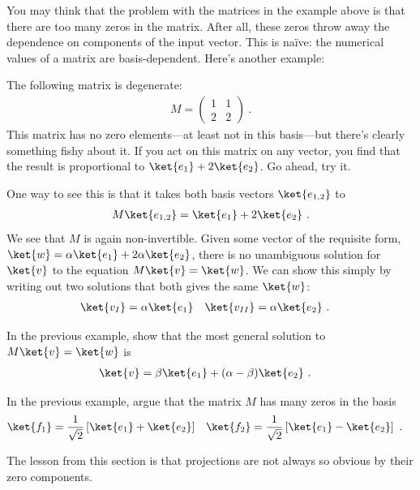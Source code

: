 You may think that the problem with the matrices in the example above is that there are too many zeros in the matrix. After all, these zeros throw away the dependence on components of the input vector. This is na\"ive: the numerical values of a matrix are basis-dependent. Here's another example:
% 
\begin{example}
The following matrix is degenerate:
\begin{align}
    M = 
    \begin{pmatrix}
        1 & 1 \\
        2 & 2
    \end{pmatrix} \ .
\end{align}
This matrix has no zero elements---at least not in this basis---but there's clearly something fishy about it. If you act on this matrix on any vector, you find that the result is proportional to $\ket{e_1} + 2 \ket{e_2}$. Go ahead, try it. 

One way to see this is that it takes both basis vectors $\ket{e_{1,2}}$ to
\begin{align}
    M\ket{e_{1,2}} = \ket{e_1} + 2 \ket{e_2} \ .
\end{align}
We see that $M$ is again non-invertible. Given some vector of the requisite form, $\ket{w} = \alpha \ket{e_1} + 2\alpha \ket{e_2}$, there is no unambiguous solution for $\ket{v}$ to the equation $M\ket{v} = \ket{w}$. We can show this simply by writing out two solutions that both gives the same $\ket{w}$:
\begin{align}
    \ket{v_I} &= \alpha \ket{e_1}
    &
    \ket{v_{II}} &= \alpha \ket{e_2} \ .
\end{align}
\end{example}
\begin{exercise}
In the previous example, show that the most general solution to $M\ket{v} = \ket{w}$ is
\begin{align}
    \ket{v} &= \beta\ket{e_1} + (\alpha-\beta)\ket{e_2} \ .
\end{align}
\end{exercise}
\begin{exercise}
In the previous example, argue that the matrix $M$ has many zeros in the basis
\begin{align}
    \ket{f_1}&= \frac{1}{\sqrt{2}}
    \left[\ket{e_1}+\ket{e_2}\right]
    &
    \ket{f_2}&= \frac{1}{\sqrt{2}}
    \left[\ket{e_1}-\ket{e_2}\right] \ .
\end{align}
\end{exercise}
The lesson from this section is that projections are not always so obvious by their zero components. 


